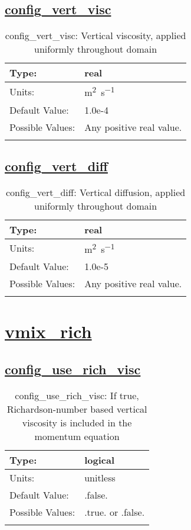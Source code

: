 \subsection[config\_vert\_visc]{\hyperref[sec:nm_tab_vmix_const]{config\_vert\_visc}}
\label{subsec:nm_sec_config_vert_visc}
\begin{center}
\begin{longtable}{| p{2.0in} || p{4.0in} |}
    \hline
    Type: & real \\
    \hline
    Units: & \si{m^2.s^{-1}} \\
    \hline
    Default Value: & 1.0e-4 \\
    \hline
    Possible Values: & Any positive real value. \\
    \hline
    \caption{config\_vert\_visc: Vertical viscosity, applied uniformly throughout domain}
\end{longtable}
\end{center}
\subsection[config\_vert\_diff]{\hyperref[sec:nm_tab_vmix_const]{config\_vert\_diff}}
\label{subsec:nm_sec_config_vert_diff}
\begin{center}
\begin{longtable}{| p{2.0in} || p{4.0in} |}
    \hline
    Type: & real \\
    \hline
    Units: & \si{m^2.s^{-1}} \\
    \hline
    Default Value: & 1.0e-5 \\
    \hline
    Possible Values: & Any positive real value. \\
    \hline
    \caption{config\_vert\_diff: Vertical diffusion, applied uniformly throughout domain}
\end{longtable}
\end{center}
\section[vmix\_rich]{\hyperref[sec:nm_tab_vmix_rich]{vmix\_rich}}
\label{sec:nm_sec_vmix_rich}
\subsection[config\_use\_rich\_visc]{\hyperref[sec:nm_tab_vmix_rich]{config\_use\_rich\_visc}}
\label{subsec:nm_sec_config_use_rich_visc}
\begin{center}
\begin{longtable}{| p{2.0in} || p{4.0in} |}
    \hline
    Type: & logical \\
    \hline
    Units: & \si{unitless} \\
    \hline
    Default Value: & .false. \\
    \hline
    Possible Values: & .true. or .false. \\
    \hline
    \caption{config\_use\_rich\_visc: If true, Richardson-number based vertical viscosity is included in the momentum equation}
\end{longtable}
\end{center}
